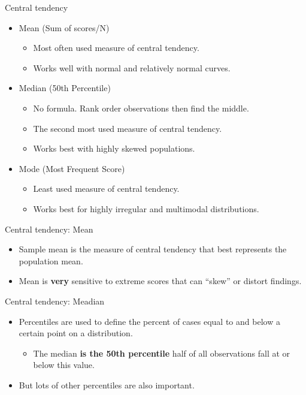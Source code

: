 \documentclass[
  ignorenonframetext,
]{beamer}
\providecommand{\tightlist}{%
  \setlength{\itemsep}{0pt}\setlength{\parskip}{0pt}}
\begin{document}
\begin{frame}{Central tendency}
\label{central-tendency}
\begin{itemize}
\tightlist
\item
  Mean (Sum of scores/N)

  \begin{itemize}
  \tightlist
  \item
    Most often used measure of central tendency.
  \item
    Works well with normal and relatively normal curves.
  \end{itemize}
\item
  Median (50th Percentile)

  \begin{itemize}
  \tightlist
  \item
    No formula. Rank order observations then find the middle.
  \item
    The second most used measure of central tendency.
  \item
    Works best with highly skewed populations.
  \end{itemize}
\item
  Mode (Most Frequent Score)

  \begin{itemize}
  \tightlist
  \item
    Least used measure of central tendency.
  \item
    Works best for highly irregular and multimodal distributions.
  \end{itemize}
\end{itemize}
\end{frame}

\begin{frame}{Central tendency: Mean}
\label{central-tendency-mean}
\begin{itemize}
\item
  Sample mean is the measure of central tendency that best represents
  the population mean.
\item
  Mean is \textbf{very} sensitive to extreme scores that can ``skew'' or
  distort findings.
\end{itemize}
\end{frame}

\begin{frame}{Central tendency: Meadian}
\label{central-tendency-meadian}
\begin{itemize}
\tightlist
\item
  Percentiles are used to define the percent of cases equal to and below
  a certain point on a distribution.

  \begin{itemize}
  \tightlist
  \item
    The median \textbf{is the 50th percentile } half of all observations
    fall at or below this value.
  \end{itemize}
\item
  But lots of other percentiles are also important.
\end{itemize}
\end{frame}
\end{document}
